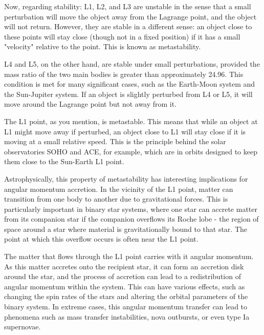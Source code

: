 Now, regarding stability: L1, L2, and L3 are unstable in the sense that a small perturbation will move the object away from the Lagrange point, and the object will not return. However, they are stable in a different sense: an object close to these points will stay close (though not in a fixed position) if it has a small "velocity" relative to the point. This is known as metastability.

L4 and L5, on the other hand, are stable under small perturbations, provided the mass ratio of the two main bodies is greater than approximately 24.96. This condition is met for many significant cases, such as the Earth-Moon system and the Sun-Jupiter system. If an object is slightly perturbed from L4 or L5, it will move around the Lagrange point but not away from it.

The L1 point, as you mention, is metastable. This means that while an object at L1 might move away if perturbed, an object close to L1 will stay close if it is moving at a small relative speed. This is the principle behind the solar observatories SOHO and ACE, for example, which are in orbits designed to keep them close to the Sun-Earth L1 point.

Astrophysically, this property of metastability has interesting implications for angular momentum accretion. In the vicinity of the L1 point, matter can transition from one body to another due to gravitational forces. This is particularly important in binary star systems, where one star can accrete matter from its companion star if the companion overflows its Roche lobe - the region of space around a star where material is gravitationally bound to that star. The point at which this overflow occurs is often near the L1 point.

The matter that flows through the L1 point carries with it angular momentum. As this matter accretes onto the recipient star, it can form an accretion disk around the star, and the process of accretion can lead to a redistribution of angular momentum within the system. This can have various effects, such as changing the spin rates of the stars and altering the orbital parameters of the binary system. In extreme cases, this angular momentum transfer can lead to phenomena such as mass transfer instabilities, nova outbursts, or even type Ia supernovae.